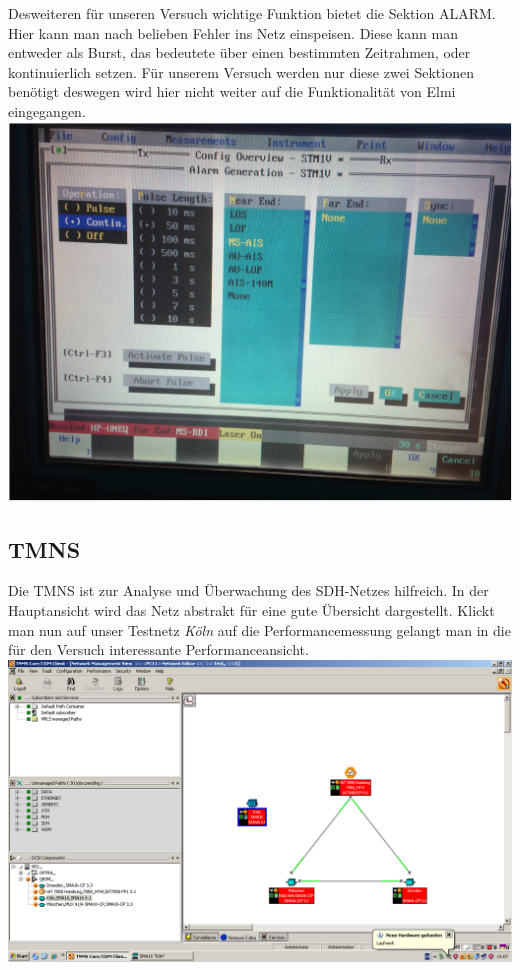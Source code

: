 Desweiteren für unseren Versuch wichtige Funktion bietet die Sektion ALARM. Hier kann man nach belieben Fehler ins Netz einspeisen. Diese kann man entweder als Burst, das bedeutete über einen bestimmten Zeitrahmen, oder kontinuierlich setzen. Für unserem Versuch werden nur diese zwei Sektionen benötigt deswegen wird hier nicht weiter auf die Funktionalität von Elmi eingegangen.
\includegraphics[scale=1]{sdh/elmi_fehler.png}  

\subsection{TMNS}
Die TMNS ist zur Analyse und Überwachung des SDH-Netzes hilfreich. In der Hauptansicht wird das Netz abstrakt für eine gute Übersicht dargestellt. Klickt man nun auf unser Testnetz \textit{Köln}
auf die Performancemessung gelangt man in die für den Versuch interessante Performanceansicht. 
\includegraphics[scale=1]{sdh/tnms.bmp} 

